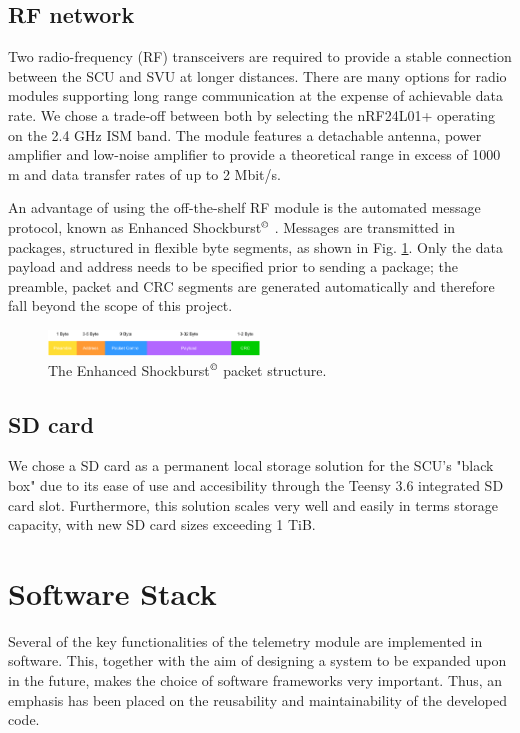 \documentclass[conference]{IEEEtran}
\begin{document}
\subsection{RF network} %
Two radio-frequency (RF) transceivers are required to provide a stable connection between the SCU and SVU at longer distances. There are many options for radio modules supporting long range communication at the expense of achievable data rate. We chose a trade-off between both by selecting the nRF24L01+ operating on the 2.4 GHz ISM band. The module features a detachable antenna, power amplifier and low-noise amplifier to provide a theoretical range in excess of 1000 m and data transfer rates of up to 2 Mbit/s.

An advantage of using the off-the-shelf RF module is the automated message protocol, known as Enhanced Shockburst$^\copyright$ \cite{shockburst}. Messages are transmitted in packages, structured in flexible byte segments, as shown in Fig. \ref{fig:shockburst}. Only the data payload and address needs to be specified prior to sending a package; the preamble, packet and CRC segments are generated automatically and therefore fall beyond the scope of this project. 

\begin{figure}[h]
    \centering
    \includegraphics[width=0.5\textwidth]{documentation/images/EnhancedShockburst.pdf}
    \caption{The Enhanced Shockburst$^\copyright$ packet structure.}
    \label{fig:shockburst}
\end{figure}

\subsection{SD card}

We chose a SD card as a permanent local storage solution for the SCU's "black box" due to its ease of use and accesibility through the Teensy 3.6 integrated SD card slot. Furthermore, this solution scales very well and easily in terms storage capacity, with new SD card sizes exceeding 1 TiB.

\section{Software Stack}

Several of the key functionalities of the telemetry module are implemented in software. This, together with the aim of designing a system to be expanded upon in the future, makes the choice of software frameworks very important. Thus, an emphasis has been placed on the reusability and maintainability of the developed code.
\end{document}
